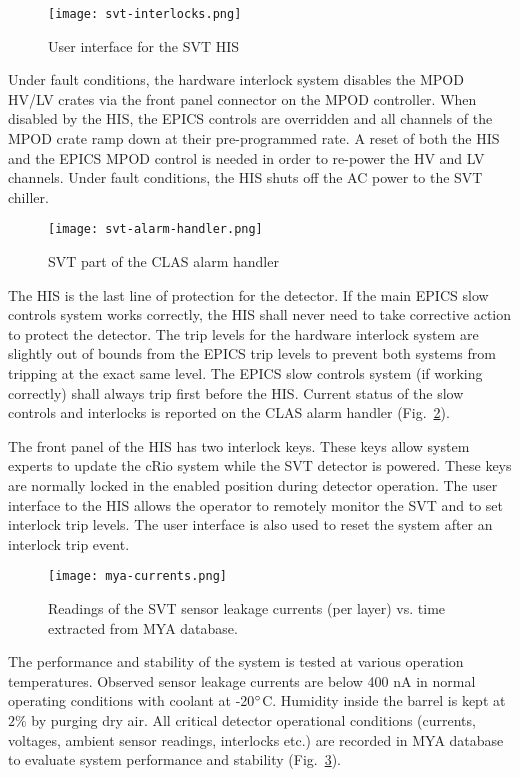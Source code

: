 \begin{figure}[hbt] 
\centering 
\texttt{[image: svt-interlocks.png]}
\caption{User interface for the SVT HIS}
\label{fig:svt-interlocks}
\end{figure}

Under fault conditions, the hardware interlock system disables the MPOD HV/LV crates via the front panel connector on the MPOD controller. When disabled by the HIS, the EPICS controls are overridden and all channels of the MPOD crate ramp down at their pre-programmed rate. A reset of both the HIS and the EPICS MPOD control is needed in order to re-power the HV and LV channels. Under fault conditions, the HIS shuts off the AC power to the SVT chiller. 

\begin{figure}[hbt] 
\centering 
\texttt{[image: svt-alarm-handler.png]}
\caption{SVT part of the CLAS alarm handler}
\label{fig:svt-alarm-handler}
\end{figure}

The HIS is the last line of protection for the detector. If the main EPICS slow controls system works correctly, the HIS shall never need to take corrective action to protect the detector. The trip levels for the hardware interlock system are slightly out of bounds from the EPICS trip levels to prevent both systems from tripping at the exact same level. The EPICS slow controls system (if working correctly) shall always trip first before the HIS. Current status of the slow controls and interlocks is reported on the CLAS alarm handler (Fig.~\ref{fig:svt-alarm-handler}).

The front panel of the HIS has two interlock keys. These keys allow system experts to update the cRio system while the SVT detector is powered. These keys are normally locked in the enabled position during detector operation.
The user interface to the HIS allows the operator to remotely monitor the SVT and to set interlock trip levels. The user interface is also used to reset the system after an interlock trip event. 

\begin{figure}[hbt] 
\centering 
\texttt{[image: mya-currents.png]}
\caption{Readings of the SVT sensor leakage currents (per layer) vs. time extracted from MYA database.}
\label{fig:mya-currents}
\end{figure}

The performance and stability of the system is tested at various operation temperatures. Observed sensor leakage currents are below 400 nA in normal operating conditions with coolant at -20$\degree$C. Humidity inside the barrel is kept at $2\%$ by purging dry air. All critical detector operational conditions (currents, voltages, ambient sensor readings, interlocks etc.) are recorded in MYA database to evaluate system performance and stability (Fig.~\ref{fig:mya-currents}).


